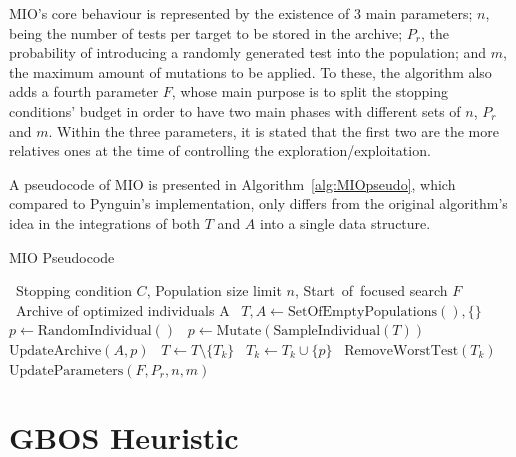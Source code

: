 \documentclass[%
  chapterprefix=false,%
  open=right,%
  twoside=true,%
  paper=a4,%
  logofile={Figures/logo.png},%
  thesistype=master,%
  UKenglish,%
]{se2thesis}
\begin{document}
MIO's core behaviour is represented by the existence of 3 main parameters; \(n\), being the number of tests per target to be stored in the archive; \(P_r\), the probability of introducing a randomly generated test into the population; and \(m\), the maximum amount of mutations to be applied.
To these, the algorithm also adds a fourth parameter \(F\), whose main purpose is to split the stopping conditions' budget in order to have two main phases with different sets of \(n\), \(P_r\) and \(m\).
Within the three parameters, it is stated that the first two are the more relatives ones at the time of controlling the exploration/exploitation.\@

A pseudocode of MIO is presented in Algorithm~\ref{alg:MIOpseudo}, which compared to Pynguin's implementation, only differs from the original algorithm's idea in the integrations of both \(T\) and \(A\) into a single data structure.

\begin{algorithm}[h!]
  \centering
  \caption{MIO Pseudocode}\label{alg:MIOpseudo}
  \begin{algorithmic}[1]
    \Require~Stopping condition \(C\), Population size limit \(n\), Start~of~focused search \(F\)
    \Ensure~Archive of optimized individuals A
    \State~\(T, A \gets \text{SetOfEmptyPopulations}(), \{\}\)
        \State~\(p \gets \text{RandomIndividual}()\)
      \Else\@
        \State~\(p \gets \text{Mutate}(\text{SampleIndividual}(T))\)
      \EndIf\@
          \State~\(\text{UpdateArchive}(A, p)\)
          \State~\(T \gets T \setminus \{T_k\}\)
        \Else\@
          \State~\(T_k \gets T_k \cup \{p\}\)
          \State~\(\text{RemoveWorstTest}(T_k)\)
          \EndIf\@
        \EndIf\@
      \EndFor\@
      \State~\(\text{UpdateParameters}(F, P_r, n, m)\)
    \EndWhile\@
  \end{algorithmic}
  \end{algorithm} 

\newpage

\section{GBOS Heuristic}
\end{document}
